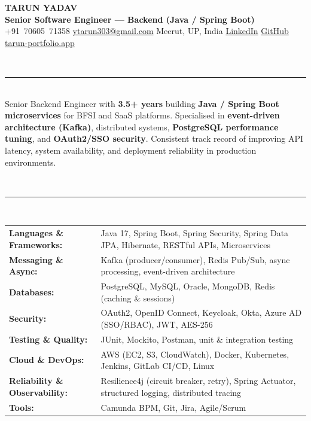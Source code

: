 \documentclass[10pt]{article}
\newcommand{\ressection}[1]{%
  \vspace{5pt}\noindent{\bfseries\color{accent}\MakeUppercase{#1}}\\[1pt]%
  \noindent\textcolor{gray!55}{\rule{\linewidth}{0.7pt}}\\[2pt]%
}
\newcommand{\linkedinurl}{https://www.linkedin.com/in/tarunfullstack}
\begin{document}
\small

\begin{center}
  {\Large\bfseries TARUN YADAV}\\[1pt]
  {\color{accent}\bfseries\small Senior Software Engineer --- Backend (Java / Spring Boot)}\\[3pt]
  {\footnotesize
    +91~70605~71358 \;\textbar\; \href{mailto:ytarun303@gmail.com}{ytarun303@gmail.com} \;\textbar\; Meerut, UP, India \;\textbar\;
    \href{\linkedinurl}{LinkedIn} \;\textbar\;
    \href{https://github.com/Tarunyadavvvvv}{GitHub} \;\textbar\;
    \href{https://tarun-portfolio.app}{tarun-portfolio.app}
  }
\end{center}

\ressection{Summary}
Senior Backend Engineer with \textbf{3.5+ years} building \textbf{Java / Spring Boot microservices} for BFSI and SaaS platforms. Specialised in \textbf{event-driven architecture (Kafka)}, distributed systems, \textbf{PostgreSQL performance tuning}, and \textbf{OAuth2/SSO security}. Consistent track record of improving API latency, system availability, and deployment reliability in production environments.

\ressection{Technical Skills}
\renewcommand{\arraystretch}{1.12}
\begin{tabularx}{\linewidth}{@{}>{\bfseries}l @{\hspace{6pt}}X@{}}
Languages \& Frameworks: & Java 17, Spring Boot, Spring Security, Spring Data JPA, Hibernate, RESTful APIs, Microservices \\
Messaging \& Async: & Kafka (producer/consumer), Redis Pub/Sub, async processing, event-driven architecture \\
Databases: & PostgreSQL, MySQL, Oracle, MongoDB, Redis (caching \& sessions) \\
Security: & OAuth2, OpenID Connect, Keycloak, Okta, Azure AD (SSO/RBAC), JWT, AES-256 \\
Testing \& Quality: & JUnit, Mockito, Postman, unit \& integration testing \\
Cloud \& DevOps: & AWS (EC2, S3, CloudWatch), Docker, Kubernetes, Jenkins, GitLab CI/CD, Linux \\
Reliability \& Observability: & Resilience4j (circuit breaker, retry), Spring Actuator, structured logging, distributed tracing \\
Tools: & Camunda BPM, Git, Jira, Agile/Scrum \\
\end{tabularx}
\end{document}
